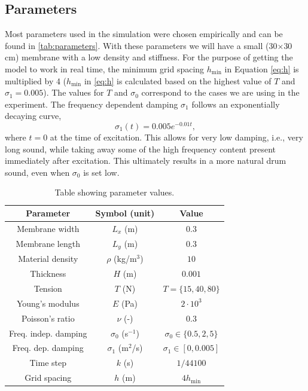 \documentclass{article}
\begin{document}
\subsection{Parameters}
Most parameters used in the simulation were chosen empirically and can be found in \autoref{tab:parameters}. With these parameters we will have a small (30$\times$30 cm) membrane with a low density and stiffness. For the purpose of getting the model to work in real time, the minimum grid spacing $h_\text{min}$ in Equation \eqref{eq:h} is multiplied by 4 ($h_\text{min}$ in \eqref{eq:h} is calculated based on the highest value of $T$ and $\sigma_1 = 0.005$). The values for $T$ and $\sigma_0$ correspond to the cases we are using in the experiment. The frequency dependent damping  $\sigma_1$ follows an exponentially decaying curve, 
\begin{equation}
    \sigma_1(t) = 0.005e^{-0.01 t},
\end{equation}
where $t=0$ at the time of excitation. This allows for very low damping, i.e., very long sound, while taking away some of the high frequency content present immediately after excitation. This ultimately results in a more natural drum sound, even when $\sigma_0$ is set low.
\begin{table}[h]
\caption{Table showing parameter values.}\label{tab:parameters}
\centering
\begin{tabular}{|c|c|c|}
    \hline
    Parameter & Symbol (unit) & Value \\
    \hline
    Membrane width & $L_x$ (m) & $0.3$\\
    Membrane length & $L_y$ (m) & $0.3$ \\
    Material density & $\rho$ (kg/m$^3$)& $10$ \\
    Thickness & $H$ (m) & $0.001$ \\
    Tension & $T$ (N) & $T = \{15, 40, 80\}$ \\
    Young's modulus & $E$ (Pa)& $2\cdot 10^3$ \\
    Poisson's ratio & $\nu$ (-)& $0.3$ \\
    Freq. indep. damping & $\sigma_0$ (s$^{-1}$) & $\sigma_0 \in \{0.5, 2, 5\}$\\
    Freq. dep. damping & $\sigma_1$ (m$^2$/s) & $\sigma_1 \in [0, 0.005]$\\
    Time step & $k$ (s) & $1/44100$\\
    Grid spacing & $h$ (m) & $4h_\text{min}$\\
    \hline
\end{tabular}
\end{table}
\end{document}
